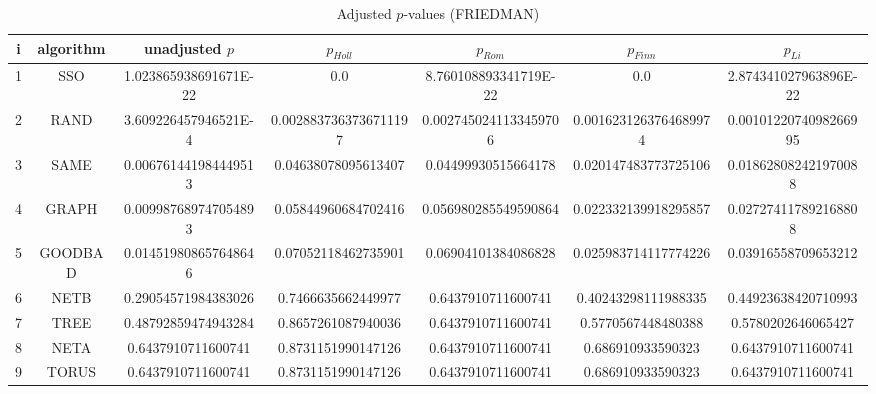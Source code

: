 \documentclass[a4paper,10pt]{article}
\begin{document}
\begin{landscape}
\begin{table}[!htp]
\centering\scriptsize
\caption{Adjusted $p$-values (FRIEDMAN)}
\begin{tabular}{ccccccc}
i&algorithm&unadjusted $p$&$p_{Holl}$&$p_{Rom}$&$p_{Finn}$&$p_{Li}$\\
\hline
1& SSO&1.023865938691671E-22&0.0&8.760108893341719E-22&0.0&2.874341027963896E-22\\
2& RAND&3.609226457946521E-4&0.0028837363736711197&0.0027450241133459706&0.0016231263764689974&0.0010122074098266995\\
3& SAME&0.006761441984449513&0.04638078095613407&0.04499930515664178&0.020147483773725106&0.018628082421970088\\
4& GRAPH&0.009987689747054893&0.05844960684702416&0.056980285549590864&0.022332139918295857&0.027274117892168808\\
5& GOODBAD&0.014519808657648646&0.07052118462735901&0.06904101384086828&0.025983714117774226&0.03916558709653212\\
6& NETB&0.29054571984383026&0.7466635662449977&0.6437910711600741&0.40243298111988335&0.44923638420710993\\
7& TREE&0.48792859474943284&0.8657261087940036&0.6437910711600741&0.5770567448480388&0.5780202646065427\\
8& NETA&0.6437910711600741&0.8731151990147126&0.6437910711600741&0.686910933590323&0.6437910711600741\\
9& TORUS&0.6437910711600741&0.8731151990147126&0.6437910711600741&0.686910933590323&0.6437910711600741\\
\hline
\end{tabular}
\end{table}


\newpage


\end{landscape}
\end{document}
